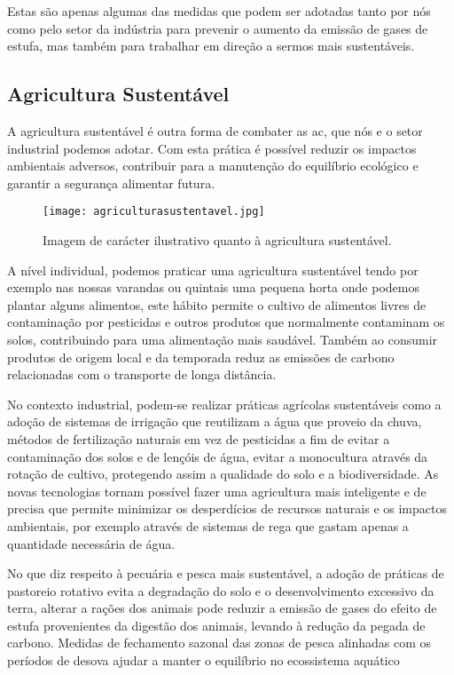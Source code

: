 \documentclass{report}
\begin{document}
Estas são apenas algumas das medidas que podem ser adotadas tanto por nós como pelo setor da indústria para prevenir o aumento da emissão de gases de estufa, mas também para trabalhar em direção a sermos mais sustentáveis.

\subsection{Agricultura Sustentável}

A agricultura sustentável é outra forma de combater as \ac{ac}, que nós e o setor industrial podemos adotar. Com esta prática é possível reduzir os impactos ambientais adversos, contribuir para a manutenção do equilíbrio ecológico e garantir a segurança alimentar futura.

\begin{figure}[H]
	\centering
	\texttt{[image: agriculturasustentavel.jpg]}
	\caption{Imagem de carácter ilustrativo quanto à agricultura sustentável.}
	\label{fig:eolicas}
\end{figure}

A nível individual, podemos praticar uma agricultura sustentável tendo por exemplo nas nossas varandas ou quintais uma pequena horta onde podemos plantar alguns alimentos, este hábito permite o cultivo de alimentos livres de contaminação por pesticidas e outros produtos que normalmente contaminam os solos, contribuindo para uma alimentação mais saudável. Também ao consumir produtos de origem local e da temporada reduz as emissões de carbono relacionadas com o transporte de longa distância.

No contexto industrial, podem-se realizar práticas agrícolas sustentáveis como a adoção de sistemas de irrigação que reutilizam a água que proveio da chuva, métodos de fertilização naturais em vez de pesticidas a fim de evitar a contaminação dos solos e de lençóis de água, evitar a monocultura através da rotação de cultivo, protegendo assim a qualidade do solo e a biodiversidade. As novas tecnologias tornam possível fazer uma agricultura mais inteligente e de precisa que permite minimizar os desperdícios de recursos naturais e os impactos ambientais, por exemplo através de sistemas de rega que gastam apenas a quantidade necessária de água.

No que diz respeito à pecuária e pesca mais sustentável, a adoção de práticas de pastoreio rotativo evita a degradação do solo e o desenvolvimento excessivo da terra, alterar a rações dos animais pode reduzir a emissão de gases do efeito de estufa provenientes da digestão dos animais, levando à redução da pegada de carbono. Medidas de fechamento sazonal das zonas de pesca alinhadas com os períodos de desova ajudar a manter o equilíbrio no ecossistema aquático
\end{document}
